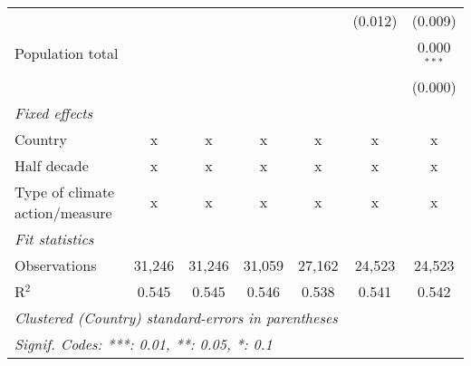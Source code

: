 \begin{tabular}{lcccccc}
                                                &         &         &         &         & (0.012)      & (0.009)\\   
   Population total                             &         &         &         &         &              & 0.000$^{***}$\\   
                                                &         &         &         &         &              & (0.000)\\   
   \emph{Fixed effects}\\
   Country                                      & x       & x       & x       & x       & x            & x\\  
   Half decade                                  & x       & x       & x       & x       & x            & x\\  
   Type of climate action/measure               & x       & x       & x       & x       & x            & x\\  
   \midrule \emph{Fit statistics}\\
   Observations                                 & 31,246  & 31,246  & 31,059  & 27,162  & 24,523       & 24,523\\  
   R$^2$                                        & 0.545   & 0.545   & 0.546   & 0.538   & 0.541        & 0.542\\  
   \midrule
   \multicolumn{7}{l}{\emph{Clustered (Country) standard-errors in parentheses}}\\
   \multicolumn{7}{l}{\emph{Signif. Codes: ***: 0.01, **: 0.05, *: 0.1}}\\
\end{tabular}
\par\endgroup


